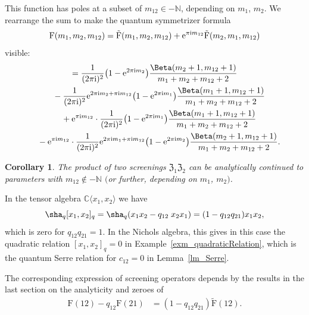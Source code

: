 \documentclass[10pt,a4paper]{amsart}
\numberwithin{equation}{section}
\newtheorem{cor}[teo]{Corollary}
\newcommand{\N}{\mathbb{N}}
\newcommand{\C}{\mathbb{C}}
\renewcommand{\i}{\mathrm{i}}
\newcommand{\zem}{\mathfrak{Z}}
\newcommand{\Fp}{\mathrm{F}}
\newcommand{\rFp}{\tilde{\mathrm{F}}}
\begin{document}
This function has poles at a subset of $m_{12}\in -\N$, depending on $m_1$, $m_2$. We rearrange the sum to make the quantum symmetrizer formula
\[ \Fp(m_1,m_2,m_{12}) =\rFp(m_1,m_2,m_{12})+{\rm e}^{\pi\i m_{12}}  \rFp(m_2,m_1,m_{12})
\] visible:
\begin{gather*}
	 =\frac{1}{(2\pi\i)^2}\big(1-{\rm e}^{2\pi\i m_2}\big)
	 \frac{\Beta(m_2+1,m_{12}+1)}{m_1+m_2+m_{12}+2}\\
	 \quad{} -\frac{1}{(2\pi\i)^2}{\rm e}^{2\pi\i m_2+\pi\i m_{12}}\big(1-{\rm e}^{2\pi\i m_1}\big)
	 \frac{\Beta(m_1+1,m_{12}+1)}{m_1+m_2+m_{12}+2}\\
	 \quad{} +{\rm e}^{\pi\i m_{12}}\cdot \frac{1}{(2\pi\i)^2}\big(1-{\rm e}^{2\pi\i m_1}\big)
	 \frac{\Beta(m_1+1,m_{12}+1)}{m_1+m_2+m_{12}+2}\\
	 \quad{} -{\rm e}^{\pi\i m_{12}}\cdot \frac{1}{(2\pi\i)^2}{\rm e}^{2\pi\i m_1+\pi\i m_{12}}\big(1-{\rm e}^{2\pi\i m_2}\big)
	 \frac{\Beta(m_2+1,m_{12}+1)}{m_1+m_2+m_{12}+2}.
	 \end{gather*}
\begin{cor}\label{cor_product}
	The product of two screenings $\zem_1\zem_2$ can be analytically continued to parameters with $m_{12}\not\in-\N$ $($or further, depending on $m_1$, $m_2)$.
\end{cor}

In the tensor algebra $\C\langle x_1,x_2 \rangle$ we have
\[\sha_q[x_1,x_2]_q=\sha_q(x_1x_2-q_{12}\;x_2x_1)=(1-q_{12}q_{21})x_1x_2,\]
which is zero for $q_{12}q_{21}=1$. In the Nichols algebra, this gives in this case the quadratic relation $[x_1,x_2]_q=0$ in Example~\ref{exm_quadraticRelation}, which is the quantum Serre relation for $c_{12}=0$ in Lemma~\ref{lm_Serre}.

The corresponding expression of screening operators depends by the results in the last section on the analyticity and zeroes of
\begin{align*}
\Fp(12)-q_{12}\Fp(21)
&=(1-q_{12}q_{21})\rFp(12).
\end{align*}
\end{document}
